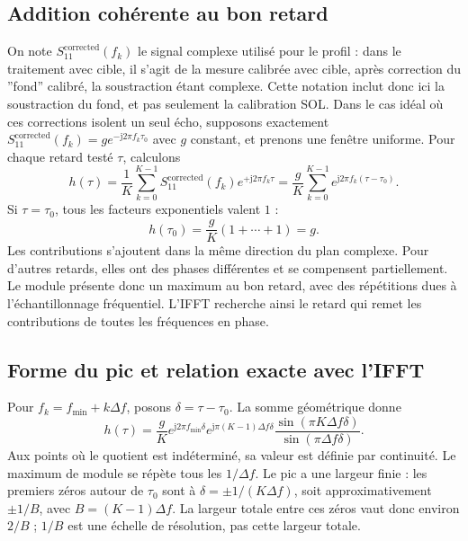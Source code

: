 \documentclass[11pt,a4paper]{article}
\newcommand{\jj}{\mathrm{j}}
\begin{document}
\subsection{Addition cohérente au bon retard}
On note $S_{11}^{\mathrm{corrected}}(f_k)$ le signal complexe utilisé pour
le profil : dans le traitement avec cible, il s'agit de la mesure calibrée
avec cible, après correction du ''fond'' calibré, la soustraction étant complexe.
Cette notation inclut donc ici la soustraction du fond, et pas seulement
la calibration SOL. Dans le cas idéal où ces corrections isolent un seul
écho, supposons exactement
$S_{11}^{\mathrm{corrected}}(f_k)=g e^{-\jj2\pi f_k\tau_0}$ avec $g$ constant, et prenons
une fenêtre uniforme. Pour chaque retard testé $\tau$, calculons
\begin{equation}
 h(\tau)=\frac1K\sum_{k=0}^{K-1}S_{11}^{\mathrm{corrected}}(f_k) e^{+\jj2\pi f_k\tau}
 =\frac{g}{K}\sum_{k=0}^{K-1}
 e^{\jj2\pi f_k(\tau-\tau_0)}.
\end{equation}
Si $\tau=\tau_0$, tous les facteurs exponentiels valent $1$ :
\begin{equation}
 h(\tau_0)=\frac{g}{K}(1+\cdots+1)=g.
\end{equation}
Les contributions s'ajoutent dans la même direction du plan complexe.
Pour d'autres retards, elles ont des phases différentes et se compensent
partiellement. Le module présente donc un maximum au bon retard, avec des
répétitions dues à l'échantillonnage fréquentiel.
L'IFFT recherche ainsi le retard qui remet les contributions de
 toutes les fréquences en phase.

\subsection{Forme du pic et relation exacte avec l'IFFT}
Pour $f_k=f_{\min}+k\Delta f$, posons $\delta=\tau-\tau_0$.
La somme géométrique donne
\begin{equation}
 h(\tau)=\frac{g}{K}
 e^{\jj2\pi f_{\min}\delta}
 e^{\jj\pi(K-1)\Delta f\delta}
 \frac{\sin(\pi K\Delta f\delta)}{\sin(\pi\Delta f\delta)}.
\end{equation}
Aux points où le quotient est indéterminé, sa valeur est définie par
continuité. Le maximum de module se répète tous les $1/\Delta f$.
Le pic a une largeur finie : les premiers zéros autour de $\tau_0$ sont
à $\delta=\pm1/(K\Delta f)$, soit approximativement $\pm1/B$, avec
$B=(K-1)\Delta f$. La largeur totale entre ces zéros vaut donc environ
$2/B$ ; $1/B$ est une échelle de résolution, pas cette largeur totale.
\end{document}
